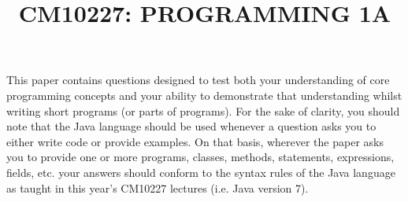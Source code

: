 \documentclass{exam}
\title{CM10227: PROGRAMMING 1A}
\date{}
\begin{document}
\maketitle

This paper contains questions designed to test both your understanding of core programming concepts and  your ability to demonstrate that understanding whilst writing short programs (or parts of programs). For the sake of clarity, you should note that the Java language should be used whenever a question asks you to either write code or provide examples. On that basis, wherever the paper asks you to provide one or more programs, classes, methods, statements, expressions, fields, etc. your answers should conform to the syntax rules of the Java language as taught in this year's CM10227 lectures (i.e. Java version 7).  

\clearpage





\
\end{document}
